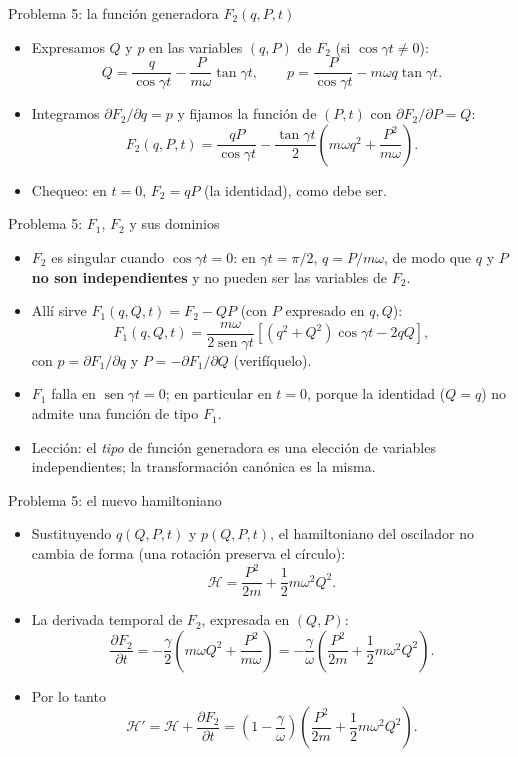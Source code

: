 \documentclass[spanish]{beamer}
\providecommand{\sen}{\operatorname{sen}}
\newcommand{\Ham}{\mathcal{H}}
\newcommand{\pd}[2]{\frac{\partial #1}{\partial #2}}
\begin{document}
\begin{frame}{Problema 5: la función generadora $F_2(q,P,t)$}
\begin{itemize}
  \item<1-> Expresamos $Q$ y $p$ en las variables $(q,P)$ de $F_2$ (si $\cos\gamma t\neq 0$):
  \[
    Q = \frac{q}{\cos\gamma t} - \frac{P}{m\omega}\tan\gamma t, \qquad
    p = \frac{P}{\cos\gamma t} - m\omega q\tan\gamma t .
  \]
  \item<2-> Integramos $\partial F_2/\partial q = p$ y fijamos la función de $(P,t)$
        con $\partial F_2/\partial P = Q$:
  \[
    F_2(q,P,t) = \frac{qP}{\cos\gamma t}
                 - \frac{\tan\gamma t}{2}\left( m\omega q^2 + \frac{P^2}{m\omega} \right).
  \]
  \item<3-> Chequeo: en $t=0$, $F_2 = qP$ (la identidad), como debe ser.
\end{itemize}
\end{frame}

\begin{frame}{Problema 5: $F_1$, $F_2$ y sus dominios}
\begin{itemize}
  \item<1-> $F_2$ es singular cuando $\cos\gamma t = 0$: en $\gamma t=\pi/2$,
        $q = P/m\omega$, de modo que $q$ y $P$ \textbf{no son independientes}
        y no pueden ser las variables de $F_2$.
  \item<2-> Allí sirve $F_1(q,Q,t) = F_2 - QP$ (con $P$ expresado en $q,Q$):
  \[
    F_1(q,Q,t) = \frac{m\omega}{2\sen\gamma t}
                 \left[ \left(q^2 + Q^2\right)\cos\gamma t - 2qQ \right],
  \]
  con $p = \partial F_1/\partial q$ y $P = -\partial F_1/\partial Q$ (verifíquelo).
  \item<3-> $F_1$ falla en $\sen\gamma t = 0$; en particular en $t=0$, porque la
        identidad ($Q=q$) no admite una función de tipo $F_1$.
  \item<4-> Lección: el \emph{tipo} de función generadora es una elección de
        variables independientes; la transformación canónica es la misma.
\end{itemize}
\end{frame}

\begin{frame}{Problema 5: el nuevo hamiltoniano}
\begin{itemize}
  \item<1-> Sustituyendo $q(Q,P,t)$ y $p(Q,P,t)$, el hamiltoniano del oscilador
        no cambia de forma (una rotación preserva el círculo):
  \[
    \Ham = \frac{P^2}{2m} + \frac12 m\omega^2 Q^2 .
  \]
  \item<2-> La derivada temporal de $F_2$, expresada en $(Q,P)$:
  \[
    \pd{F_2}{t} = -\frac{\gamma}{2}\left( m\omega Q^2 + \frac{P^2}{m\omega} \right)
                = -\frac{\gamma}{\omega}\left( \frac{P^2}{2m} + \frac12 m\omega^2 Q^2 \right).
  \]
  \item<3-> Por lo tanto
  \[
    \Ham' = \Ham + \pd{F_2}{t}
          = \left( 1 - \frac{\gamma}{\omega} \right)
            \left( \frac{P^2}{2m} + \frac12 m\omega^2 Q^2 \right).
  \]
\end{itemize}
\end{frame}
\end{document}
